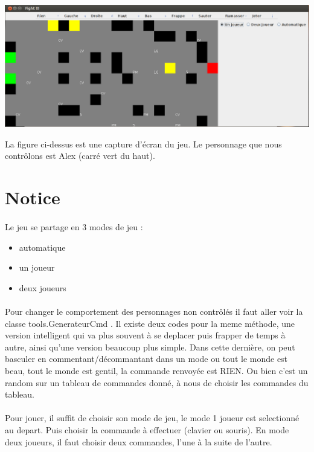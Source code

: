 \documentclass[a4paper,titlepage,openany,12pt]{report}
\begin{document}
\includegraphics[scale=0.3]{../saved2}


La figure ci-dessus est une capture d'écran du jeu.
Le personnage que nous contrôlons est Alex (carré vert du haut).


\section*{Notice}
\paragraph{}
Le jeu se partage en 3 modes de jeu :
\begin{itemize}
\item automatique
\item un joueur
\item deux joueurs
\end{itemize}

\paragraph{}
Pour changer le comportement des personnages non contrôlés il faut
aller voir la classe tools.GenerateurCmd .
Il existe deux codes pour la meme méthode, une version intelligent qui
va plus souvent à se deplacer puis frapper de temps à autre, ainsi
qu'une version beaucoup plus simple. Dans cette dernière, on peut
basculer en commentant/décommantant dans un mode ou tout le monde est
beau, tout le monde est gentil, la commande renvoyée est RIEN. Ou bien
c'est un random sur un tableau de commandes donné, à nous de choisir
les commandes du tableau.

\paragraph{}
Pour jouer, il suffit de choisir son mode de jeu, le mode 1 joueur est
selectionné au depart. Puis choisir la commande à effectuer (clavier
ou souris).
En mode deux joueurs, il faut choisir deux commandes, l'une à la suite
de l'autre.
\end{document}
